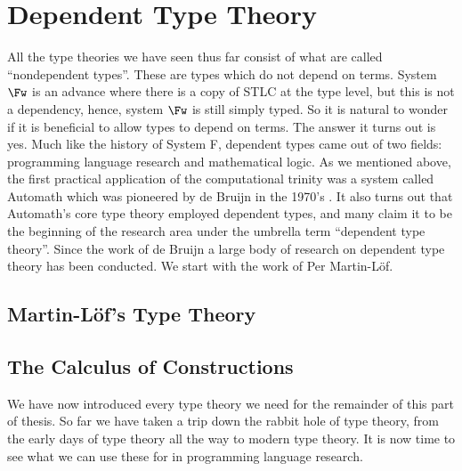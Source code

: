 \chapter{Dependent Type Theory}
\label{chap:dependent_type_theory}
All the type theories we have seen thus far consist of what are called
``nondependent types''.  These are types
which do not depend on terms.  System $\Fw$ is an advance where there
is a copy of STLC at the type level, but this is not a dependency,
hence, system $\Fw$ is still simply typed.  So it is natural to wonder
if it is beneficial to allow types to depend on terms.  The answer it
turns out is yes. Much like the history of System F, dependent types
came out of two fields: programming language research and mathematical
logic.  As we mentioned above, the first
practical application of the computational trinity was a system called
Automath which was pioneered by de Bruijn in the 1970's
\cite{DeBruijn:1970}.  It also turns out that Automath's core type
theory employed dependent types, and many claim it to be the beginning
of the research area under the umbrella term ``dependent type
theory''.  Since the work of de Bruijn a large body of research on
dependent type theory has been conducted.  We start with the work of
Per Martin-L\"of.

\section{Martin-L\"of's Type Theory}
\label{sec:martin-lofs_type_theory}


\section{The Calculus of Constructions}
\label{sec:the_calculus_of_constructions}




We have now introduced every type theory we need for the remainder of
this part of thesis.  So far we have taken a trip down the rabbit hole
of type theory, from the early days of type theory all the way to
modern type theory.  It is now time to see what we can use these for
in programming language research.

